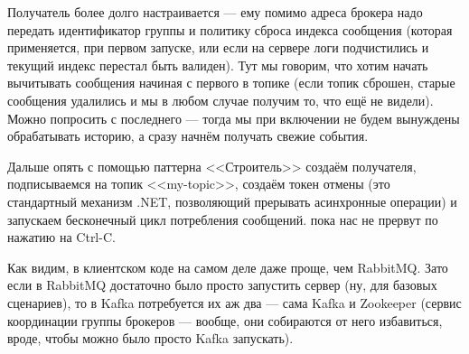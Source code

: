 \documentclass[a5paper]{article}
\begin{document}
Получатель более долго настраивается --- ему помимо адреса брокера надо передать идентификатор группы и политику сброса индекса сообщения (которая применяется, при первом запуске, или если на сервере логи подчистились и текущий индекс перестал быть валиден). Тут мы говорим, что хотим начать вычитывать сообщения начиная с первого в топике (если топик сброшен, старые сообщения удалились и мы в любом случае получим то, что ещё не видели). Можно попросить с последнего --- тогда мы при включении не будем вынуждены обрабатывать историю, а сразу начнём получать свежие события.

Дальше опять с помощью паттерна <<Строитель>> создаём получателя, подписываемся на топик <<my-topic>>, создаём токен отмены (это стандартный механизм .NET, позволяющий прерывать асинхронные операции) и запускаем бесконечный цикл потребления сообщений. пока нас не прервут по нажатию на Ctrl-C.

Как видим, в клиентском коде на самом деле даже проще, чем RabbitMQ. Зато если в RabbitMQ достаточно было просто запустить сервер (ну, для базовых сценариев), то в Kafka потребуется их аж два --- сама Kafka и Zookeeper (сервис координации группы брокеров --- вообще, они собираются от него избавиться, вроде, чтобы можно было просто Kafka запускать).

\end{document}
